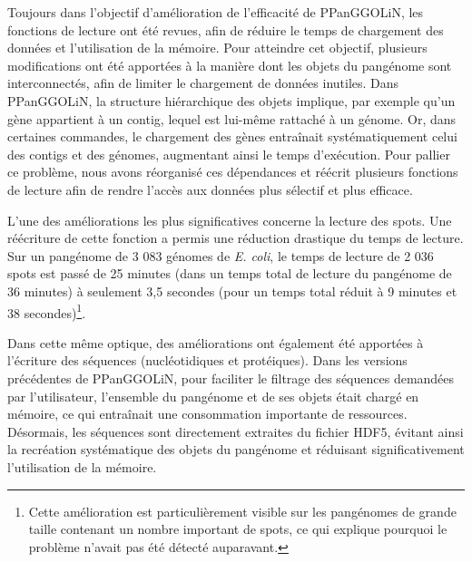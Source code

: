 Toujours dans l'objectif d'amélioration de l’efficacité de PPanGGOLiN, les fonctions de lecture ont été revues, afin de réduire le temps de chargement des données et l’utilisation de la mémoire. 
Pour atteindre cet objectif, plusieurs modifications ont été apportées à la manière dont les objets du pangénome sont interconnectés, afin de limiter le chargement de données inutiles. Dans PPanGGOLiN, la structure hiérarchique des objets implique, par exemple qu’un gène appartient à un contig, lequel est lui-même rattaché à un génome. Or, dans certaines commandes, le chargement des gènes entraînait systématiquement celui des contigs et des génomes, augmentant ainsi le temps d’exécution. Pour pallier ce problème, nous avons réorganisé ces dépendances et réécrit plusieurs fonctions de lecture afin de rendre l’accès aux données plus sélectif et plus efficace.

L’une des améliorations les plus significatives concerne la lecture des spots. Une réécriture de cette fonction a permis une réduction drastique du temps de lecture. Sur un pangénome de 3 083 génomes de \textit{E. coli}, le temps de lecture de 2 036 spots est passé de 25 minutes (dans un temps total de lecture du pangénome de 36 minutes) à seulement 3,5 secondes (pour un temps total réduit à 9 minutes et 38 secondes)\footnote{Cette amélioration est particulièrement visible sur les pangénomes de grande taille contenant un nombre important de spots, ce qui explique pourquoi le problème n’avait pas été détecté auparavant.}.

Dans cette même optique, des améliorations ont également été apportées à l’écriture des séquences (nucléotidiques et protéiques). Dans les versions précédentes de PPanGGOLiN, pour faciliter le filtrage des séquences demandées par l’utilisateur, l’ensemble du pangénome et de ses objets était chargé en mémoire, ce qui entraînait une consommation importante de ressources. Désormais, les séquences sont directement extraites du fichier HDF5, évitant ainsi la recréation systématique des objets du pangénome et réduisant significativement l’utilisation de la mémoire.


